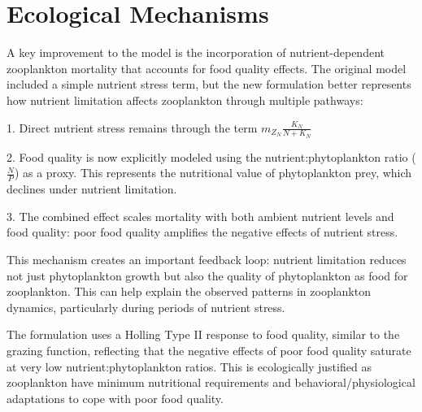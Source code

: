 \section{Ecological Mechanisms}

A key improvement to the model is the incorporation of nutrient-dependent zooplankton mortality that accounts for food quality effects. The original model included a simple nutrient stress term, but the new formulation better represents how nutrient limitation affects zooplankton through multiple pathways:

1. Direct nutrient stress remains through the term $m_{Z_N} \frac{K_N}{N + K_N}$

2. Food quality is now explicitly modeled using the nutrient:phytoplankton ratio ($\frac{N}{P}$) as a proxy. This represents the nutritional value of phytoplankton prey, which declines under nutrient limitation.

3. The combined effect scales mortality with both ambient nutrient levels and food quality: poor food quality amplifies the negative effects of nutrient stress.

This mechanism creates an important feedback loop: nutrient limitation reduces not just phytoplankton growth but also the quality of phytoplankton as food for zooplankton. This can help explain the observed patterns in zooplankton dynamics, particularly during periods of nutrient stress.

The formulation uses a Holling Type II response to food quality, similar to the grazing function, reflecting that the negative effects of poor food quality saturate at very low nutrient:phytoplankton ratios. This is ecologically justified as zooplankton have minimum nutritional requirements and behavioral/physiological adaptations to cope with poor food quality.
